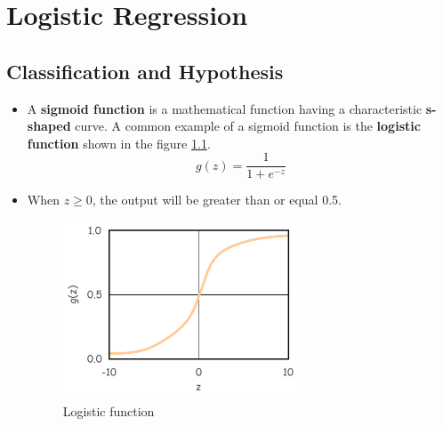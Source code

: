 \chapter{Logistic Regression}


\section{Classification and Hypothesis }
\begin{itemize} 
    \item A \textbf{sigmoid function} is a mathematical function having a characteristic \textbf{s-shaped} curve. A common example of a sigmoid function is the \textbf{logistic function} shown in the figure \ref{fig:sigmoid}.
    \begin{equation}
        g(z) = \frac{1}{1+e^{-z}}
    \end{equation}

    \item When $z \geq 0$, the output will be greater than or equal 0.5.
    \begin{figure}[!htbp]\label{fig:sigmoid}
        \centering
        \includegraphics[width=2.8in]{./images/sigmoid.png}
        \caption{Logistic function}
    \end{figure}


\end{itemize}
